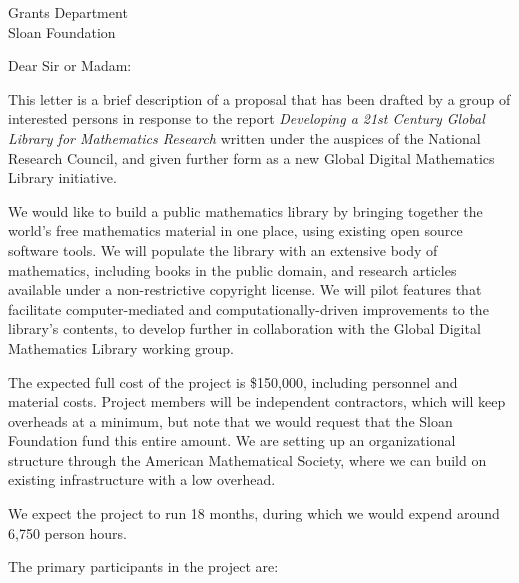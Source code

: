 \documentclass{letter}
\begin{document}
\signature{Volker Sorge}
\address{Volker Sorge\\
School of Computer Science\\
University of Birmingham\\
B15 2TT, UK}
\begin{letter}{Grants Department \\ Sloan Foundation}
\opening{Dear Sir or Madam:}


This letter is a brief description of a proposal that has been drafted
by a group of interested persons in response to the report
\emph{Developing a 21st Century Global Library for Mathematics
  Research} written under the auspices of the National Research
Council, and given further form as a new Global Digital Mathematics
Library initiative.

We would like to build a public mathematics library by bringing
together the world's free mathematics material in one place, using
existing open source software tools.
%
We will populate the library with an extensive body of mathematics,
including books in the public domain, and research articles available
under a non-restrictive copyright license.
%
We will pilot features that facilitate computer-mediated and
computationally-driven improvements to the library's contents, to
develop further in collaboration with the Global Digital Mathematics
Library working group.

The expected full cost of the project is \$150,000, including
personnel and material costs.  Project members will be independent
contractors, which will keep overheads at a minimum, but note that we
would request that the Sloan Foundation fund this entire amount.  We
are setting up an organizational structure through the American
Mathematical Society, where we can build on existing infrastructure
with a low overhead.

We expect the project to run 18 months, during which we would expend
around 6,750 person hours.

The primary participants in the project are:


\end{letter}
\end{document}
